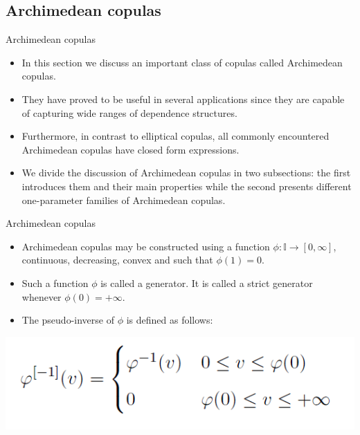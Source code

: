\documentclass[11pt]{beamer}
\theoremstyle{plain}
\theoremstyle{definition}
\theoremstyle{remark}
\begin{document}
\subsection{Archimedean copulas}
%
\begin{frame}{Archimedean copulas}
   \begin{itemize}
      \item In this section we discuss an important class of copulas called Archimedean copulas. 
      \item They have proved to be useful in several applications since they are capable of capturing wide ranges of dependence 
      structures. 
      \item Furthermore, in contrast to elliptical copulas, all commonly encountered Archimedean copulas have closed form expressions.
      \item We divide the discussion of Archimedean copulas in two subsections: the first introduces them and their main properties 
      while the second presents different one-parameter families of Archimedean copulas.
\end{itemize}
\end{frame}
%
\begin{frame}{Archimedean copulas}
\begin{itemize}
\item
Archimedean copulas may be constructed using a function $\phi : \mathbb{I} \rightarrow [0, \infty]$, 
continuous, decreasing, convex and such that $\phi(1) = 0$. 
\item
Such a function $\phi$ is called a generator. It is called a strict generator whenever $\phi(0) = +\infty$. 
\item
The pseudo-inverse of $\phi$ is defined as follows:
\end{itemize}
\begin{center}
\includegraphics[scale=.5]{fig/copule_archimedee_pseudoinv.PNG} 
\end{center}
\end{frame}
\end{document}
